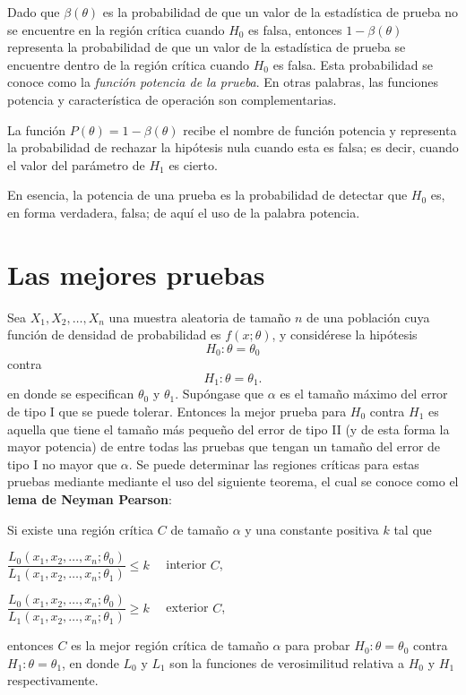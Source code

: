Dado que $\beta(\theta)$ es la probabilidad de que un valor de la estadística de prueba no se encuentre en la región crítica cuando $H_0$ es falsa, entonces $1-\beta(\theta)$ representa la probabilidad de que un valor de la estadística de prueba se encuentre dentro de la región crítica cuando $H_0$ es falsa. Esta probabilidad se conoce como la \textit{función potencia de la prueba}. En otras palabras, las funciones potencia y característica de operación son complementarias. 

\begin{def.}
    La función $P(\theta)=1-\beta(\theta)$ recibe el nombre de función potencia y representa la probabilidad de rechazar la hipótesis nula cuando esta es falsa; es decir, cuando el valor del parámetro de $H_1$ es cierto.
\end{def.}

En esencia, la potencia de una prueba es la probabilidad de detectar que $H_0$ es, en forma verdadera, falsa; de aquí el uso de la palabra potencia. 


\section{Las mejores pruebas}

Sea $X_1,X_2,\ldots,X_n$ una muestra aleatoria de tamaño $n$ de una población cuya función de densidad de probabilidad es $f(x;\theta)$, y considérese la hipótesis
$$H_0:\theta=\theta_0$$
contra
$$H_1:\theta=\theta_1.$$
en donde se especifican $\theta_0$ y $\theta_1$. Supóngase que $\alpha$ es el tamaño máximo del error de tipo I que se puede tolerar. Entonces la mejor prueba para $H_0$ contra $H_1$ es aquella que tiene el tamaño más pequeño del error de tipo II (y de esta forma la mayor potencia) de entre todas las pruebas que tengan un tamaño del error de tipo I no mayor que $\alpha$. Se puede determinar las regiones críticas para estas pruebas mediante mediante el uso del siguiente teorema, el cual se conoce como el \textbf{lema de Neyman Pearson}:

\begin{teo}
    Si existe una región crítica $C$ de tamaño $\alpha$ y una constante positiva $k$ tal que
    \begin{center}
	$\dfrac{L_0(x_1,x_2,\ldots,x_n; \theta_0)}{L_1(x_1,x_2,\ldots,x_n;\theta_1)}\leq k\quad$ interior $C$,
    \end{center}
    \begin{center}
	$\dfrac{L_0(x_1,x_2,\ldots,x_n; \theta_0)}{L_1(x_1,x_2,\ldots,x_n;\theta_1)}\geq k\quad$ exterior $C$,
    \end{center}
    entonces $C$ es la mejor región crítica de tamaño $\alpha$ para probar $H_0:\theta=\theta_0$ contra $H_1:\theta = \theta_1$, en donde $L_0$  y $L_1$ son la funciones de verosimilitud relativa a $H_0$ y $H_1$ respectivamente.
\end{teo}


